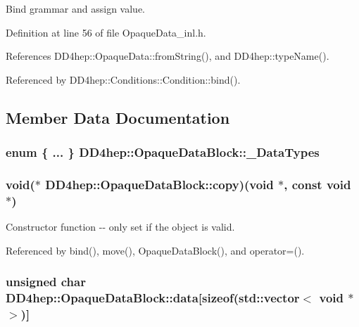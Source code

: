 Bind grammar and assign value. 

Definition at line 56 of file OpaqueData\_\-inl.h.

References DD4hep::OpaqueData::fromString(), and DD4hep::typeName().

Referenced by DD4hep::Conditions::Condition::bind().

\subsection{Member Data Documentation}
\hypertarget{class_d_d4hep_1_1_opaque_data_block_a0e431bafd05dde4afeba30aab68e8930}{
\subsubsection[{\_\-DataTypes}]{\setlength{\rightskip}{0pt plus 5cm}enum \{ ... \}   {\bf DD4hep::OpaqueDataBlock::\_\-DataTypes}}}
\label{class_d_d4hep_1_1_opaque_data_block_a0e431bafd05dde4afeba30aab68e8930}
\hypertarget{class_d_d4hep_1_1_opaque_data_block_a7da11d357cbefd4d6cf56390d321f69e}{
\subsubsection[{copy}]{\setlength{\rightskip}{0pt plus 5cm}void($\ast$ {\bf DD4hep::OpaqueDataBlock::copy})(void $\ast$, const void $\ast$)}}
\label{class_d_d4hep_1_1_opaque_data_block_a7da11d357cbefd4d6cf56390d321f69e}


Constructor function -\/-\/ only set if the object is valid. 

Referenced by bind(), move(), OpaqueDataBlock(), and operator=().\hypertarget{class_d_d4hep_1_1_opaque_data_block_ab598893c35f36d91467423c37a28984e}{
\subsubsection[{data}]{\setlength{\rightskip}{0pt plus 5cm}unsigned char {\bf DD4hep::OpaqueDataBlock::data}\mbox{[}sizeof(std::vector$<$ void $\ast$ $>$)\mbox{]}}}
\label{class_d_d4hep_1_1_opaque_data_block_ab598893c35f36d91467423c37a28984e}


